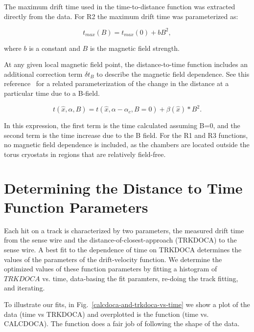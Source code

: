 The maximum drift time used in the time-to-distance function was extracted 
directly from the data.  For R2 the maximum drift time was parameterized as:

\begin{equation} 
\label{eq-bmax}
t_{max}(B) = t_{max}(0) + b B^2,
\end{equation}

\noindent
where $b$ is a constant and $B$ is the magnetic field strength.

At any given local magnetic field point, the distance-to-time function 
includes an additional correction term $\delta t_B$ to describe 
the magnetic field dependence.  See this reference~\cite{qin96} for a related
parameterization of the change in the distance at a particular time due to a
B-field. 

\begin{equation}
\label{XTB}
t(\hat{x},\alpha,B) = t(\hat{x},\alpha-\alpha_c, B=0) +  \beta(\hat{x})*B^2.
\end{equation}

\noindent
In this expression, the first term is the time calculated assuming B=0, and the
second term is the time increase due to the B field.  For the R1 and R3 functions, no magnetic field 
dependence is included, as the chambers are located outside the torus 
cryostats in regions that are relatively field-free.

\section{Determining the Distance to Time Function Parameters}
Each hit on a track is characterized by two parameters, the measured drift 
time from the sense wire and the distance-of-closest-approach (TRKDOCA) to the 
sense wire.  A best fit to the dependence of time on TRKDOCA determines the
values of the parameters of the drift-velocity function. 
We determine the optimized values of these function parameters by fitting
a histogram of $TRKDOCA$ vs. time, data-basing the fit paramters, re-doing
the track fitting, and iterating.

To illustrate our fits, in Fig.~\ref{calcdoca-and-trkdoca-vs-time} we show a plot of
the data (time vs TRKDOCA) and overplotted is the function (time vs. CALCDOCA).
The function does a fair job of following the shape of the data.

